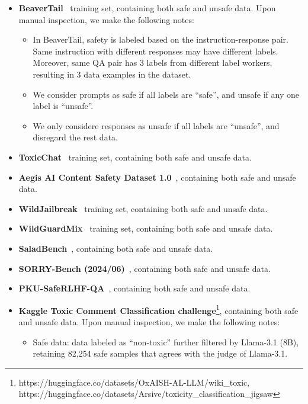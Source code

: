 \begin{itemize}
    \item \textbf{BeaverTail}~\citep{ji2024beavertails} training set, containing both safe and unsafe data. Upon manual inspection, we make the following notes:
    \begin{itemize}
        \item In BeaverTail, safety is labeled based on the instruction-response pair. Same instruction with different responses may have different labels. Moreover, same QA pair has 3 labels from different label workers, resulting in 3 data examples in the dataset.
        \item We consider prompts as safe if all labels are ``safe'', and unsafe if any one label is ``unsafe''. 
        \item We only considere responses as unsafe if all labels are ``unsafe'', and disregard the rest data.
    \end{itemize}
    \item \textbf{ToxicChat}~\citep{lin2023toxicchat} training set, containing both safe and unsafe data.
    \item \textbf{Aegis AI Content Safety Dataset 1.0}~\citep{ghosh2024aegis}, containing both safe and unsafe data. 
    \item \textbf{WildJailbreak}~\citep{wildteaming2024} training set, containing both safe and unsafe data.
    \item \textbf{WildGuardMix}~\citep{wildguard2024} training set, containing both safe and unsafe data.
    \item \textbf{SaladBench}~\citep{li2024salad}, containing both safe and unsafe data. 
    \item \textbf{SORRY-Bench (2024/06)}~\citep{xie2024sorrybench}, containing both safe and unsafe data. 
    \item \textbf{PKU-SafeRLHF-QA}~\citep{ji2024pku}, containing both safe and unsafe data. 
    \item \textbf{Kaggle Toxic Comment Classification challenge}\footnote{https://huggingface.co/datasets/OxAISH-AL-LLM/wiki\_toxic, https://huggingface.co/datasets/Arsive/toxicity\_classification\_jigsaw}, containing both safe and unsafe data. Upon manual inspection, we make the following notes:
    \begin{itemize}
        \item Safe data: data labeled as ``non-toxic'' further filtered by Llama-3.1 (8B), retaining 82,254 safe samples that agrees with the judge of Llama-3.1.
    \end{itemize}

\end{itemize}
